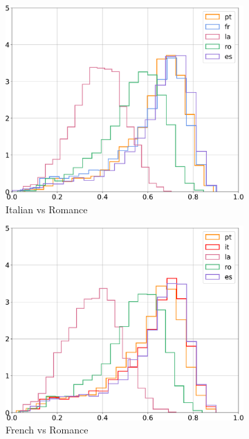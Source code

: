 \documentclass[output=paper]{langsci/langscibook}
\begin{document}
\begin{figure}[!ht]
    \begin{subfigure}{0.30\textwidth}
        \includegraphics[width=\linewidth]{figures/UBAN_histogram_distances_it_all_contour.pdf}
        \caption{Italian vs Romance}
    \end{subfigure}
    \begin{subfigure}{0.30\textwidth}
        \includegraphics[width=\linewidth]{figures/UBAN_histogram_distances_fr_all_contour.pdf}
        \caption{French vs Romance}
    \end{subfigure}
    \begin{subfigure}{0.30\textwidth}

\end{subfigure}
\end{figure}
\end{document}
